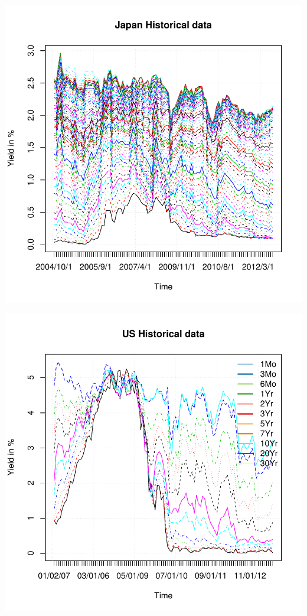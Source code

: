 \documentclass{article}
\begin{document}
\begin{spacing}{1.5}
\begin{center}
\includegraphics{Graduation_Paper-008}
\end{center}

\begin{center}
\includegraphics{Graduation_Paper-009}
\end{center}



\end{spacing}
\end{document}
